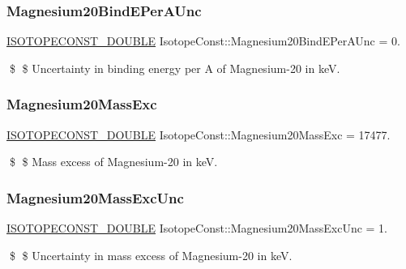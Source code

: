 \subsubsection{\texorpdfstring{Magnesium20\+Bind\+E\+Per\+A\+Unc}{Magnesium20BindEPerAUnc}}
{\footnotesize\ttfamily \mbox{\hyperlink{group___isotope_const-_macros_ga8f45a7272ce02c0b4c65c44636ed719a}{I\+S\+O\+T\+O\+P\+E\+C\+O\+N\+S\+T\+\_\+\+D\+O\+U\+B\+LE}} Isotope\+Const\+::\+Magnesium20\+Bind\+E\+Per\+A\+Unc = 0.}

\$ \$ Uncertainty in binding energy per A of Magnesium-\/20 in keV. \mbox{\label{group___isotope_const-_magnesium-_mg20_gae3f075136fe1a834d931d8f02936c59a}} 
\subsubsection{\texorpdfstring{Magnesium20\+Mass\+Exc}{Magnesium20MassExc}}
{\footnotesize\ttfamily \mbox{\hyperlink{group___isotope_const-_macros_ga8f45a7272ce02c0b4c65c44636ed719a}{I\+S\+O\+T\+O\+P\+E\+C\+O\+N\+S\+T\+\_\+\+D\+O\+U\+B\+LE}} Isotope\+Const\+::\+Magnesium20\+Mass\+Exc = 17477.}

\$ \$ Mass excess of Magnesium-\/20 in keV. \mbox{\label{group___isotope_const-_magnesium-_mg20_ga7f798a48a2250c4954141b77273059f9}} 
\subsubsection{\texorpdfstring{Magnesium20\+Mass\+Exc\+Unc}{Magnesium20MassExcUnc}}
{\footnotesize\ttfamily \mbox{\hyperlink{group___isotope_const-_macros_ga8f45a7272ce02c0b4c65c44636ed719a}{I\+S\+O\+T\+O\+P\+E\+C\+O\+N\+S\+T\+\_\+\+D\+O\+U\+B\+LE}} Isotope\+Const\+::\+Magnesium20\+Mass\+Exc\+Unc = 1.}

\$ \$ Uncertainty in mass excess of Magnesium-\/20 in keV. \mbox{\label{group___isotope_const-_magnesium-_mg20_gafc51d43bbec4172683988ba111c0d4af}} 
